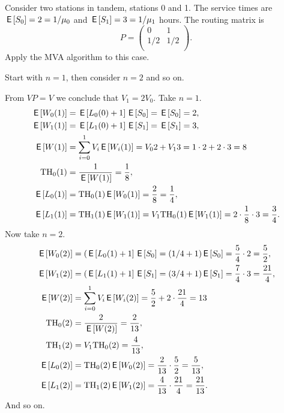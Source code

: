 \begin{exercise}\label{ex:mva_numerical}
  Consider two stations in tandem, stations 0 and 1. The service times
  are $\,\mathsf{E}\left[ S_0\right] = 2=1/\mu_0$ and $\,\mathsf{E}\left[ S_1\right] = 3=1/\mu_1$ hours. The routing matrix is
  \begin{equation*}
    P=
    \begin{pmatrix}
      0 & 1\\
1/2 & 1/2\\
    \end{pmatrix}.
  \end{equation*}
Apply the MVA algorithm to this case.
\begin{hint}
Start with $n=1$, then consider $n=2$ and so on.
\end{hint}
\begin{solution}
  From $V P = V$ we conclude that $V_1=2V_0$.  Take $n=1$.
  \begin{align*}
\,\mathsf{E}\left[ W_0(1)\right] &= \,\mathsf{E}\left[ L_0(0)+1\right]\,\mathsf{E}\left[ S_0\right] = \,\mathsf{E}\left[ S_0 \right]= 2,\\
 \,\mathsf{E}\left[ W_1(1)\right] &= \,\mathsf{E}\left[ L_1(0)+1\right]\,\mathsf{E}\left[ S_1\right] = \,\mathsf{E}\left[ S_1\right] = 3,\\
 \,\mathsf{E}\left[ W(1)\right] &= \sum_{i=0}^1 V_i \,\mathsf{E}\left[ W_i(1)\right] = V_0 2 + V_1  3 = 1\cdot 2 + 2 \cdot 3 = 8\\
 \mathrm{TH}_0(1) &= \frac{1}{\,\mathsf{E}\left[ W(1)\right]} = \frac18, \\
 \,\mathsf{E}\left[ L_0(1)\right] &= \mathrm{TH}_0(1) \,\mathsf{E}\left[ W_0(1)\right] = \frac28=\frac14, \\
 \,\mathsf{E}\left[ L_1(1)\right] &= \mathrm{TH}_1(1) \,\mathsf{E}\left[ W_1(1)\right] = V_1 \mathrm{TH}_0(1) \,\mathsf{E}\left[ W_1(1)\right]= 2 \cdot \frac18 \cdot 3 = \frac34.\\
  \end{align*}
Now take $n=2$.     
  \begin{align*}
\,\mathsf{E}\left[ W_0(2) \right]&= (\,\mathsf{E}\left[ L_0(1)+1\right]\,\mathsf{E}\left[ S_0\right]= (1/4+1)\,\mathsf{E}\left[ S_0\right] = \frac54\cdot2=\frac52,\\
\,\mathsf{E}\left[ W_1(2) \right]&= (\,\mathsf{E}\left[ L_1(1)+1\right]\,\mathsf{E}\left[ S_1\right] = (3/4+1)\,\mathsf{E}\left[ S_1\right] = \frac74\cdot3=\frac{21}4,\\
\,\mathsf{E}\left[ W(2) \right]&= \sum_{i=0}^1 V_i \,\mathsf{E}\left[ W_i(2)\right] = \frac52 + 2 \cdot \frac{21}4=13\\
\mathrm{TH}_0(2) &= \frac{2}{\,\mathsf{E}\left[ W(2)\right]} = \frac2{13}, \\
\mathrm{TH}_1(2) &= V_1 \mathrm{TH}_0(2) = \frac4{13}, \\
\,\mathsf{E}\left[ L_0(2)\right] &= \mathrm{TH}_0(2) \,\mathsf{E}\left[ W_0(2)\right] = \frac2{13}\cdot \frac52=\frac5{13}, \\
\,\mathsf{E}\left[ L_1(2)\right] &= \mathrm{TH}_1(2) \,\mathsf{E}\left[ W_1(2)\right] = \frac{4}{13} \cdot \frac{21}{4} = \frac{21}{13}.\\
  \end{align*}
And so on.
\end{solution}
\end{exercise}


